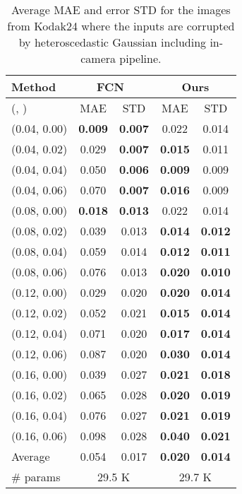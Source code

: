 \documentclass[10pt,twocolumn,letterpaper]{article}
\begin{document}
\begin{table}[h]
	\centering
	\caption{Average MAE and error STD for the images from Kodak24 where the inputs are corrupted by heteroscedastic Gaussian including in-camera pipeline. }
	\label{table:estimator_more}
	\begin{adjustbox}{width=0.8\linewidth}
		\begin{tabular}{l|cc|cc}
			\toprule
			Method   & \multicolumn{2}{c|}{FCN~\cite{guo2019toward}} & \multicolumn{2}{c}{Ours} \\
			\hline 
			(, ) & MAE        & STD        & MAE           & STD          \\
			\hline \hline
			(0.04,	0.00) &	\textbf{0.009} &	\textbf{0.007} &	0.022 &	0.014 \\
			(0.04,	0.02) &	0.029 &\textbf{0.007} &	\textbf{0.015} &	0.011 \\
			(0.04,	0.04) &	0.050 &	\textbf{0.006} &	\textbf{0.009} &	0.009 \\
			(0.04,	0.06) &	0.070 &	\textbf{0.007} &	\textbf{0.016} &	0.009 \\
			(0.08,	0.00) &	\textbf{0.018} &	\textbf{0.013} &	0.022 &	0.014 \\
			(0.08,	0.02) &	0.039 &	0.013 &	\textbf{0.014} &	\textbf{0.012} \\ 
			(0.08,	0.04) &	0.059 &	0.014 &	\textbf{0.012} &	\textbf{0.011} \\
			(0.08,	0.06) &	0.076 &	0.013 &	\textbf{0.020} &	\textbf{0.010} \\
			(0.12,	0.00) &	0.029 &	0.020 &	\textbf{0.020} &	\textbf{0.014} \\ 
			(0.12,	0.02) &	0.052 &	0.021 &	\textbf{0.015} &	\textbf{0.014} \\ 
			(0.12,	0.04) &	0.071 &	0.020 &	\textbf{0.017} &	\textbf{0.014} \\
			(0.12,	0.06) &	0.087 &	0.020 &	\textbf{0.030} &	\textbf{0.014} \\ 
			(0.16,	0.00) &	0.039 &	0.027 &	\textbf{0.021} &	\textbf{0.018} \\ 
			(0.16,	0.02) &	0.065 &	0.028 &	\textbf{0.020} &	\textbf{0.019} \\ 
			(0.16,	0.04) &	0.076 &	0.027 &	\textbf{0.021} &	\textbf{0.019} \\ 
			(0.16,	0.06) &	0.098 &	0.028 &	\textbf{0.040} &	\textbf{0.021} \\						
			\hline
			Average & 0.054 & 0.017& \textbf{0.020}& \textbf{0.014}\\
			\hline
			\# params & \multicolumn{2}{c|}{29.5 K} & \multicolumn{2}{c}{29.7 K} \\			
			\bottomrule			
		\end{tabular}
	\end{adjustbox}
\end{table}
\end{document}
